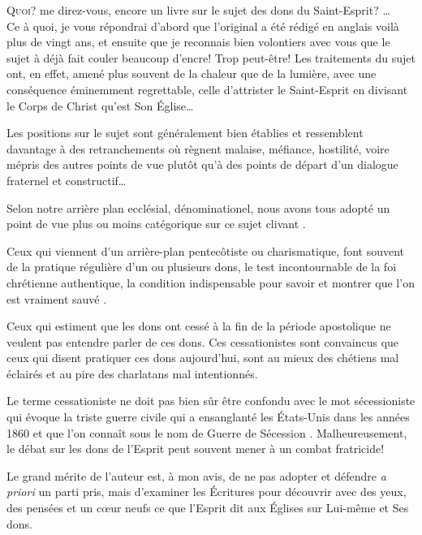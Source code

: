 
{\itshape

\lettrine[ante=\Og]{Q}{uoi?} me direz-vous, encore un livre sur le sujet des dons du Saint-Esprit? \Fg{}\dots{}\\
Ce à quoi, je vous répondrai d'abord que l'original a été rédigé en anglais voilà plus de vingt ans, et ensuite que je reconnais bien volontiers avec vous que le sujet à déjà fait couler beaucoup d'encre! Trop peut-être! Les traitements du sujet ont, en effet, amené plus souvent de la \Og chaleur \Fg{} que de la lumière, avec une conséquence éminemment regrettable, celle d'attrister le Saint-Esprit en divisant le Corps de Christ qu'est Son \'Eglise\dots{}

Les positions sur le sujet sont généralement bien établies et ressemblent davantage à des retranchements où règnent malaise, méfiance, hostilité, voire mépris des autres points de vue plutôt qu'à des points de départ d'un dialogue fraternel et constructif\dots{}

Selon notre arrière plan ecclésial, dénominationel, nous avons tous adopté un point de vue plus ou moins catégorique sur ce sujet \Og clivant \Fg{}.

Ceux qui viennent d'un arrière-plan pentecôtiste ou charismatique, font souvent de la pratique régulière d'un ou plusieurs dons, le test incontournable de la foi chrétienne authentique, la condition indispensable pour savoir et montrer que l'on est \Og vraiment sauvé \Fg{}.

Ceux qui estiment que les dons ont cessé à la fin de la période apostolique ne veulent pas entendre parler de ces dons. Ces \Og cessationistes \Fg{} sont convaincus que ceux qui disent pratiquer ces dons aujourd'hui, sont au mieux des chétiens mal éclairés et au pire des charlatans mal intentionnés.

Le terme \Og cessationiste \Fg{} ne doit pas bien sûr être confondu avec le mot \Og sécessioniste \Fg{} qui évoque la triste guerre civile qui a ensanglanté les \'Etats-Unis dans les années 1860 et que l'on connaît sous le nom de \Og Guerre de Sécession \Fg{}.
 Malheureusement, le débat sur les dons de l'Esprit peut souvent mener à un combat fratricide!

Le grand mérite de l'auteur est, à mon avis, de ne pas adopter et défendre \emph{a priori} un parti pris,
 mais \Og d'examiner les \'Ecritures \Fg{} pour découvrir avec des yeux,
 des pensées et un c\oe{}ur neufs \Og ce que l'Esprit dit aux \'Eglises \Fg{}
 sur Lui-même et Ses dons.

}
